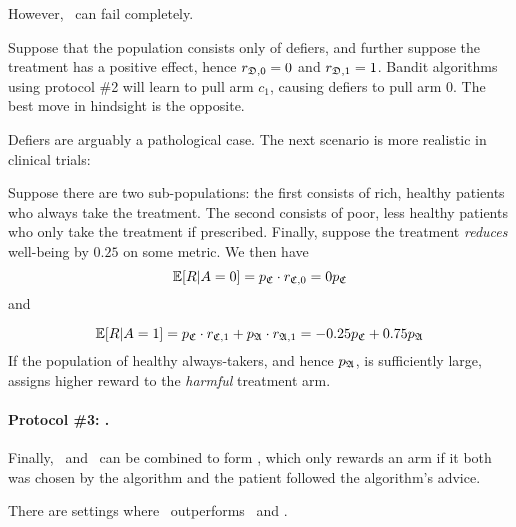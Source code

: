 However, \actual\, can fail completely.
\begin{eg}\label{eg:defiers}\eod
	Suppose that the population consists only of defiers, and further suppose the treatment has a positive effect, hence $r_{{\mathfrak D},0}=0$ and $r_{{\mathfrak D},1}=1$.
	Bandit algorithms using protocol \#2 will learn to pull arm $c_1$, causing defiers to pull arm $0$. The best move in hindsight is the opposite.
\end{eg}
Defiers are arguably a pathological case. The next scenario is more realistic in clinical trials:
\begin{eg}\label{eg:rich}\eod
	Suppose there are two sub-populations: the first consists of rich, healthy patients who always take the treatment. The second consists of poor, less healthy patients who only take the treatment if prescribed. Finally, suppose the treatment \emph{reduces} well-being by $0.25$ on some metric. We then have
	\begin{equation}
	    \operatorname*{\mathbb E}[R|A=0] = p_{\mathfrak C} \cdot r_{{\mathfrak C},0} = 0p_{\mathfrak C} 
	\end{equation} and 
	
	\begin{equation}
	    \operatorname*{\mathbb E}[R|A=1] = p_{\mathfrak C} \cdot r_{{\mathfrak C},1} + p_{\mathfrak A}\cdot r_{{\mathfrak A},1}
	    = -0.25p_{\mathfrak C} + 0.75p_{\mathfrak A}
	\end{equation}
	If the population of healthy always-takers, and hence $p_{\mathfrak A}$, is sufficiently large, \actual\, assigns higher reward to the \emph{harmful} treatment arm.
\end{eg}


\paragraph{Protocol \#3: \comply.}
Finally, \chosen\, and \actual\, can be combined to form \comply, which only rewards an arm if it both was chosen by the algorithm and the patient followed the algorithm's advice.

\begin{prop}\label{prop:comply}
	There are settings where \comply\, outperforms \chosen\, and \actual.
\end{prop}

